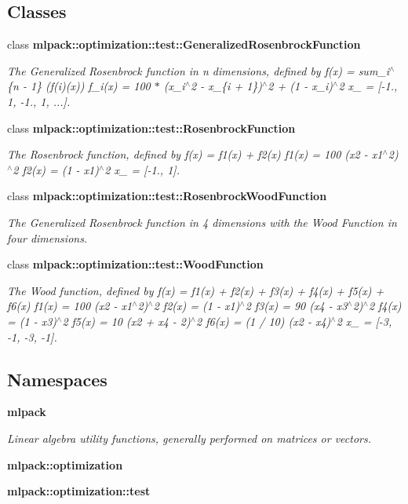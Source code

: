 \subsection*{Classes}
\begin{DoxyCompactItemize}
\item 
class {\bf mlpack\+::optimization\+::test\+::\+Generalized\+Rosenbrock\+Function}
\begin{DoxyCompactList}\small\item\em The Generalized Rosenbrock function in n dimensions, defined by f(x) = sum\+\_\+i$^\wedge$\{n -\/ 1\} (f(i)(x)) f\+\_\+i(x) = 100 $\ast$ (x\+\_\+i$^\wedge$2 -\/ x\+\_\+\{i + 1\})$^\wedge$2 + (1 -\/ x\+\_\+i)$^\wedge$2 x\+\_ = [-\/1., 1, -\/1., 1, ...]. \end{DoxyCompactList}\item 
class {\bf mlpack\+::optimization\+::test\+::\+Rosenbrock\+Function}
\begin{DoxyCompactList}\small\item\em The Rosenbrock function, defined by f(x) = f1(x) + f2(x) f1(x) = 100 (x2 -\/ x1$^\wedge$2)$^\wedge$2 f2(x) = (1 -\/ x1)$^\wedge$2 x\+\_ = [-\/1., 1]. \end{DoxyCompactList}\item 
class {\bf mlpack\+::optimization\+::test\+::\+Rosenbrock\+Wood\+Function}
\begin{DoxyCompactList}\small\item\em The Generalized Rosenbrock function in 4 dimensions with the Wood Function in four dimensions. \end{DoxyCompactList}\item 
class {\bf mlpack\+::optimization\+::test\+::\+Wood\+Function}
\begin{DoxyCompactList}\small\item\em The Wood function, defined by f(x) = f1(x) + f2(x) + f3(x) + f4(x) + f5(x) + f6(x) f1(x) = 100 (x2 -\/ x1$^\wedge$2)$^\wedge$2 f2(x) = (1 -\/ x1)$^\wedge$2 f3(x) = 90 (x4 -\/ x3$^\wedge$2)$^\wedge$2 f4(x) = (1 -\/ x3)$^\wedge$2 f5(x) = 10 (x2 + x4 -\/ 2)$^\wedge$2 f6(x) = (1 / 10) (x2 -\/ x4)$^\wedge$2 x\+\_ = [-\/3, -\/1, -\/3, -\/1]. \end{DoxyCompactList}\end{DoxyCompactItemize}
\subsection*{Namespaces}
\begin{DoxyCompactItemize}
\item 
 {\bf mlpack}
\begin{DoxyCompactList}\small\item\em Linear algebra utility functions, generally performed on matrices or vectors. \end{DoxyCompactList}\item 
 {\bf mlpack\+::optimization}
\item 
 {\bf mlpack\+::optimization\+::test}
\end{DoxyCompactItemize}


